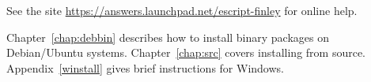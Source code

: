 See the site \url{https://answers.launchpad.net/escript-finley} for online help.

Chapter~\ref{chap:debbin} describes how to install binary packages on Debian/Ubuntu systems.
Chapter~\ref{chap:src} covers installing from source.
Appendix~\ref{winstall} gives brief instructions for Windows.


% 

